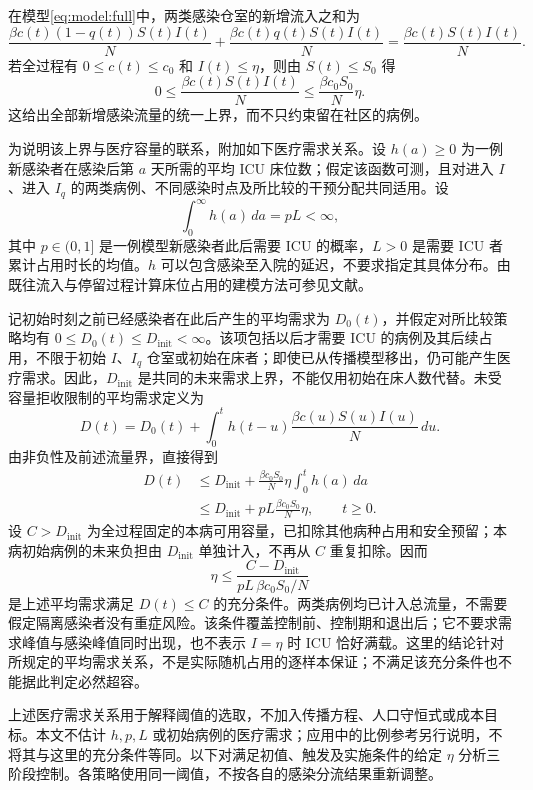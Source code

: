 \documentclass[lang=cn,a4paper,newtx]{elegantpaper}
\numberwithin{equation}{section}
\theoremstyle{plain}
\begin{document}
\begin{remark}
在模型\eqref{eq:model:full}中，两类感染仓室的新增流入之和为
\[
\frac{\beta c(t)(1-q(t))S(t)I(t)}{N}
+\frac{\beta c(t)q(t)S(t)I(t)}{N}
=\frac{\beta c(t)S(t)I(t)}{N}.
\]
若全过程有 $0\le c(t)\le c_0$ 和 $I(t)\le\eta$，则由 $S(t)\le S_0$ 得
\[
0\le\frac{\beta c(t)S(t)I(t)}{N}
\le\frac{\beta c_0S_0}{N}\eta.
\]
这给出全部新增感染流量的统一上界，而不只约束留在社区的病例。

为说明该上界与医疗容量的联系，附加如下医疗需求关系。设 $h(a)\ge0$ 为一例新感染者在感染后第 $a$ 天所需的平均 ICU 床位数；假定该函数可测，且对进入 $I$、进入 $I_q$ 的两类病例、不同感染时点及所比较的干预分配共同适用。设
\[
\int_0^\infty h(a)\,da=pL<\infty,
\]
其中 $p\in(0,1]$ 是一例模型新感染者此后需要 ICU 的概率，$L>0$ 是需要 ICU 者累计占用时长的均值。$h$ 可以包含感染至入院的延迟，不要求指定其具体分布。由既往流入与停留过程计算床位占用的建模方法可参见文献\cite{Baas2021Occupancy}。

记初始时刻之前已经感染者在此后产生的平均需求为 $D_0(t)$，并假定对所比较策略均有 $0\le D_0(t)\le D_{\mathrm{init}}<\infty$。该项包括以后才需要 ICU 的病例及其后续占用，不限于初始 $I$、$I_q$ 仓室或初始在床者；即使已从传播模型移出，仍可能产生医疗需求。因此，$D_{\mathrm{init}}$ 是共同的未来需求上界，不能仅用初始在床人数代替。未受容量拒收限制的平均需求定义为
\[
D(t)=D_0(t)+\int_0^t h(t-u)
\frac{\beta c(u)S(u)I(u)}{N}\,du.
\]
由非负性及前述流量界，直接得到
\[
\begin{aligned}
D(t)
&\le D_{\mathrm{init}}+
\frac{\beta c_0S_0}{N}\eta\int_0^t h(a)\,da\\
&\le D_{\mathrm{init}}+pL\frac{\beta c_0S_0}{N}\eta,
\qquad t\ge0.
\end{aligned}
\]
设 $C>D_{\mathrm{init}}$ 为全过程固定的本病可用容量，已扣除其他病种占用和安全预留；本病初始病例的未来负担由 $D_{\mathrm{init}}$ 单独计入，不再从 $C$ 重复扣除。因而
\[
\eta\le\frac{C-D_{\mathrm{init}}}{pL\,\beta c_0S_0/N}
\]
是上述平均需求满足 $D(t)\le C$ 的充分条件。两类病例均已计入总流量，不需要假定隔离感染者没有重症风险。该条件覆盖控制前、控制期和退出后；它不要求需求峰值与感染峰值同时出现，也不表示 $I=\eta$ 时 ICU 恰好满载。这里的结论针对所规定的平均需求关系，不是实际随机占用的逐样本保证；不满足该充分条件也不能据此判定必然超容。
\end{remark}

上述医疗需求关系用于解释阈值的选取，不加入传播方程、人口守恒式或成本目标。本文不估计 $h,p,L$ 或初始病例的医疗需求；应用中的比例参考另行说明，不将其与这里的充分条件等同。以下对满足初值、触发及实施条件的给定 $\eta$ 分析三阶段控制。各策略使用同一阈值，不按各自的感染分流结果重新调整。
\end{document}
